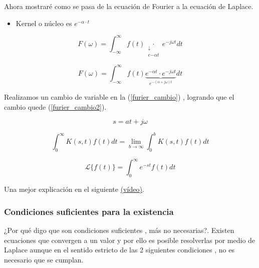 Ahora mostraré como se pasa de la ecuación de Fourier a la ecuación de Laplace.

\begin{itemize}
	\item Kernel o núcleo es  $ e^{-\alpha \cdot t} $
\end{itemize}


\begin{equation}
		F(\omega)= \int^{\infty}_{- \infty} f(t)
	\underset{\substack{\downarrow \\ e{- \alpha t}}}{\cdot}
	e^{- j \omega t} dt
\end{equation}

\begin{equation}
	F(\omega)= \int^{\infty}_{- \infty} f(t)
	\underbrace{e^{- \alpha t} \cdot e^{- j \omega t}}_{e^{- (\alpha + j \omega)t}} dt 
	\label{furier_cambio}
\end{equation}

Realizamos un cambio de  variable  en la (\ref{furier_cambio}) , logrando que el cambio quede (\ref{furier_cambio2}).

\begin{equation}
	s= at + j \omega
	\label{furier_cambio2}
\end{equation}

\begin{equation}
	\int_{0}^{\infty} K(s, t) f(t) d t=\lim _{b \rightarrow \infty} \int_{0}^{b} K(s, t) f(t) d t
\end{equation}


\begin{equation}
	\mathscr{L}\{f(t)\}=\int_{0}^{\infty} e^{-s t} f(t) d t
\end{equation}

Una mejor explicación en el siguiente  \href{https://www.youtube.com/watch?v=i1wRqo\_2zgw}{(vídeo)}.

\subsubsection{Condiciones suficientes para la existencia}

¿Por qué digo que son condiciones suficientes , más no necesarias?. Existen ecuaciones que convergen a un valor y por ello es posible resolverlas por medio de Laplace aunque en el sentido estricto de las 2 siguientes condiciones , no es necesario que se cumplan.

